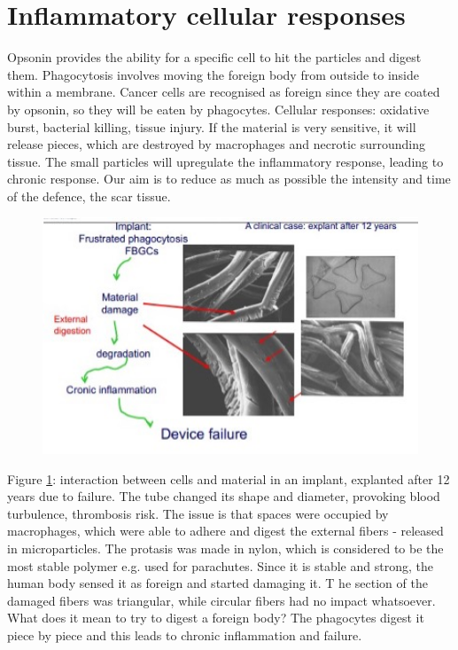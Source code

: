 \section{Inflammatory cellular responses}
Opsonin provides the ability for a specific cell to hit the particles and digest them. Phagocytosis involves moving the foreign body from outside to inside within a membrane.
Cancer cells are recognised as foreign since they are coated by opsonin, so they will be eaten by phagocytes.  
Cellular responses: oxidative burst, bacterial killing, tissue injury. 
If the material is very sensitive, it will release pieces, which are destroyed by macrophages and necrotic surrounding tissue. 
The small particles will upregulate the inflammatory response, leading to chronic response. 
Our aim is to reduce as much as possible the intensity and time of the defence, the scar tissue.

\begin{figure}[h]
\includegraphics[width=1\textwidth]{failure}
\caption{\label{fig:failure}}
\end{figure}
\noindent
Figure \ref{fig:failure}: interaction between cells and material in an implant, explanted after 12 years due to failure.  
The tube changed its shape and diameter, provoking blood turbulence, thrombosis risk. 
The issue is that spaces were occupied by macrophages, which were able to adhere and digest the external fibers - released in microparticles. 
The protasis was made in nylon, which is considered to be the most stable polymer e.g. used for parachutes. 
Since it is stable and strong, the human body sensed it as foreign and started damaging it. T
he section of the damaged fibers was triangular, while circular fibers had no impact whatsoever. 
What does it mean to try to digest a foreign body? The phagocytes digest it piece by piece and this leads to chronic inflammation and failure.

